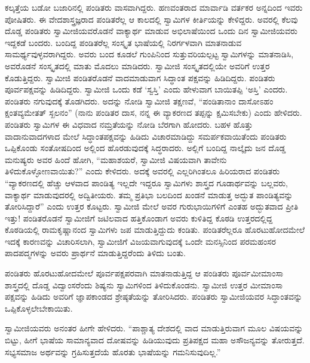  ಕಲ್ಕತ್ತೆಯ ಬಡೋ ಬಜಾರಿನಲ್ಲಿ ಪಂಡಿತರು ವಾಸವಾಗಿದ್ದರು. ಹಣವಂತರಾದ ಮಾರ್ವಾಡಿ ವರ್ತಕರ ಅನ್ನದಿಂದ ಇವರು ಪೋಷಿತರು. ಈ ವೇದಶಾಸ್ತ್ರಜ್ಞರಾದ ಪಂಡಿತರೆಲ್ಲ ಆ ಕಾಲದಲ್ಲಿ ಸ್ವಾಮಿಗಳ ಕೀರ್ತಿಯನ್ನು ಕೇಳಿದ್ದರು. ಅವರಲ್ಲಿ ಕೆಲವು ದೊಡ್ಡ ಪಂಡಿತರು ಸ್ವಾಮೀಜಿಯವರೊಡನೆ ವಾಕ್ಯಾರ್ಥ ಮಾಡುವ ಅಭಿಲಾಷೆಯಿಂದ ಒಂದು ದಿನ ಸ್ವಾಮೀಜಿಯವರು ಇದ್ದಕಡೆ ಬಂದರು. ಬಂದಿದ್ದ ಪಂಡಿತರೆಲ್ಲ ಸಂಸ್ಕೃತ ಭಾಷೆಯಲ್ಲಿ ನಿರರ್ಗಳವಾಗಿ ಮಾತನಾಡುವ ಸಾಮರ್ಥ್ಯವುಳ್ಳವರಾಗಿದ್ದರು. ಅವರು ಬಂದ ಕೂಡಲೆ ಗುಂಪಿನಿಂದ ಸುತ್ತುವರಿಯಲ್ಪಟ್ಟ ಸ್ವಾಮಿಗಳನ್ನು ಮಾತನಾಡಿಸಿ, ಅವರೊಡನೆ ಸಂಸ್ಕೃತದಲ್ಲಿ ಮಾತು ಮೊದಲು ಮಾಡಿದರು. ಸ್ವಾಮೀಜಿ ಸಂಸ್ಕೃತದಲ್ಲಿಯೇ ಅವರಿಗೆ ಉತ್ತರ ಕೊಡುತ್ತಿದ್ದರು. ಸ್ವಾಮೀಜಿ ಪಂಡಿತರೊಡನೆ ವಾದಮಾಡುವಾಗ ಸಿದ್ಧಾಂತ ಪಕ್ಷವನ್ನು ಹಿಡಿದಿದ್ದರು. ಪಂಡಿತರು ಪೂರ್ವಪಕ್ಷವನ್ನು ಹಿಡಿದಿದ್ದರು. ಸ್ವಾಮೀಜಿ ಒಂದು ಕಡೆ ‘ಸ್ವಸ್ತಿ’ ಎಂದು ಹೇಳುವಾಗ ಬಾಯಿತಪ್ಪಿ ‘ಅಸ್ತಿ’ ಎಂದರು. ಪಂಡಿತರು ನಗುವುದಕ್ಕೆ ತೊಡಗಿದರು. ಅದನ್ನು ನೋಡಿ ಸ್ವಾಮೀಜಿ ತಕ್ಷಣವೆ, “ಪಂಡಿತಾನಾಂ ದಾಸೋಽಹಂ ಕ್ಷಂತವ್ಯಮೇತತ್ ಸ್ಖಲನಂ” (ನಾನು ಪಂಡಿತರ ದಾಸ, ನನ್ನ ಈ ವ್ಯಾಕರಣದ ತಪ್ಪನ್ನು ಕ್ಷಮಿಸಬೇಕು) ಎಂದು ಹೇಳಿದರು. ಪಂಡಿತರು ಸ್ವಾಮಿಗಳ ಈ ವಿಧವಾದ ನಮ್ರತೆಯನ್ನು ನೋಡಿ ಬೆರಗಾಗಿ ಹೋದರು. ಬಹಳ ಹೊತ್ತು ವಾದಾನುವಾದಗಳಾದ ಮೇಲೆ ಸಿದ್ಧಾಂತಪಕ್ಷವನ್ನು ಹಿಡಿದು ವಿಚಾರಮಾಡಿದ್ದು ಸಮರ್ಪಕವಾಯಿತೆಂದು ಪಂಡಿತರು ಒಪ್ಪಿಕೊಂಡು ಸಂತೋಷದಿಂದ ಅಲ್ಲಿಂದ ಹೊರಡುವುದಕ್ಕೆ ಸಿದ್ಧರಾದರು. ಅಲ್ಲಿಗೆ ಬಂದಿದ್ದ ನಾಲ್ಕೈದು ಜನ ದೊಡ್ಡ ಮನುಷ್ಯರು ಅವರ ಹಿಂದೆ ಹೋಗಿ, “ಮಹಾಶಯರೆ, ಸ್ವಾಮೀಜಿ ವಿಷಯವಾಗಿ ತಾವೇನು ತಿಳಿದುಕೊಳ್ಳೋಣವಾಯಿತು?” ಎಂದು ಕೇಳಿದರು. ಅದಕ್ಕೆ ಅವರಲ್ಲಿ ಎಲ್ಲರಿಗಿಂತಲೂ ಹಿರಿಯರಾದ ಪಂಡಿತರು “ವ್ಯಾಕರಣದಲ್ಲಿ ಹೆಚ್ಚು ಆಳವಾದ ಪಾಂಡಿತ್ಯ ಇಲ್ಲದೇ ಇದ್ದರೂ ಸ್ವಾಮಿಗಳು ಶಾಸ್ತ್ರದ ಗೂಡಾರ್ಥವನ್ನು ಬಲ್ಲವರು, ವಾಕ್ಯಾರ್ಥ ಮಾಡುವುದರಲ್ಲಿ ಅದ್ವಿತೀಯರು. ತಮ್ಮ ಪ್ರತಿಭಾ ಬಲದಿಂದ ಖಂಡನೆ ಮಾಡುತ್ತ ಅದ್ಭುತ ಪಾಂಡಿತ್ಯವನ್ನು ತೋರಿಸಿದ್ದಾರೆ” ಎಂದು ಉತ್ತರ ಕೊಟ್ಟರು. ಸ್ವಾಮೀಜಿ ಮೇಲೆ ಅವರ ಗುರುಭಾಯಿಗಳಿಗೆ ಎಂತಹ ಅದ್ಭುತವಾದ ಪ್ರೀತಿ ಇತ್ತು! ಪಂಡಿತರೊಡನೆ ಸ್ವಾಮೀಜಿಗೆ ಜಟಿಲವಾದ ಹತ್ತಿಕೊಂಡಾಗ ಅವರು ಕುಳಿತಿದ್ದ ಕೊಠಡಿ ಉತ್ತರದಲ್ಲಿದ್ದ ಕೊಠಡಿಯಲ್ಲಿ ರಾಮಕೃಷ್ಣಾನಂದ ಸ್ವಾಮಿಗಳು ಜಪ ಮಾಡುತ್ತಿದ್ದುದು ಕಂಡಿತು. ಪಂಡಿತರೆಲ್ಲರೂ ಹೊರಟುಹೋದಮೇಲೆ ಇದಕ್ಕೆ ಕಾರಣವನ್ನು ವಿಚಾರಿಸಲಾಗಿ, ಸ್ವಾಮೀಜಿಗೆ ವಿಜಯವಾಗುವುದಕ್ಕೆ ಒಂದೇ ಮನಸ್ಸಿನಿಂದ ಪರಮಹಂಸರ ಪಾದಪದ್ಮಗಳನ್ನು ಅವರು ಪ್ರಾರ್ಥನೆ ಮಾಡುತ್ತಿದ್ದರೆಂದು ತಿಳಿದು ಬಂತು. 

 ಪಂಡಿತರು ಹೊರಟುಹೋದಮೇಲೆ ಪೂರ್ವಪಕ್ಷಪರವಾಗಿ ಮಾತನಾಡುತ್ತಿದ್ದ ಆ ಪಂಡಿತರು ಪೂರ್ವಮೀಮಾಂಸಾ ಶಾಸ್ತ್ರದಲ್ಲಿ ದೊಡ್ಡ ವಿದ್ವಾಂಸರೆಂದು ಶಿಷ್ಯನು ಸ್ವಾಮಿಗಳಿಂದ ತಿಳಿದುಕೊಂಡನು. ಸ್ವಾಮೀಜಿ ಉತ್ತರ ಮೀಮಾಂಸಾ ಪಕ್ಷವನ್ನು ಹಿಡಿದು ಅವರಿಗೆ ಜ್ಞಾಪಕಾಂಡದ ಶ್ರೇಷ್ಠತೆಯನ್ನು ತೋರಿಸಿದರು. ಪಂಡಿತರು ಸ್ವಾಮೀಜಿಯವರ ಸಿದ್ಧಾಂತವನ್ನು ಒಪ್ಪಿಕೊಳ್ಳಲೇಬೇಕಾಯಿತು. 

 ಸ್ವಾಮೀಜಿಯವರು ಅನಂತರ ಹೀಗೇ ಹೇಳಿದರು. “ಪಾಶ್ಚಾತ್ಯ ದೇಶದಲ್ಲಿ ವಾದ ಮಾಡುತ್ತಿರುವಾಗ ಮೂಲ ವಿಷಯವನ್ನು ಬಿಟ್ಟು, ಹೀಗೆ ಭಾಷೆಯ ಸಾಮಾನ್ಯವಾದ ದೋಷವನ್ನು ಹಿಡಿಯುವುದು ಪ್ರತಿಪಕ್ಷದ ಮಹಾ ಅಸೌಜನ್ಯವನ್ನು ತೋರುತ್ತದೆ. ಸಭ್ಯಸಮಾಜ ಅರ್ಥವನ್ನು ಗ್ರಹಿಸುತ್ತದೆಯೆ ಹೊರತು ಭಾಷೆಯನ್ನು ಗಮನಿಸುವುದಿಲ್ಲ.” 

